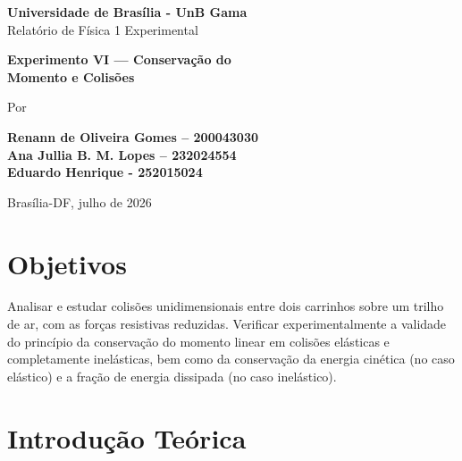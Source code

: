 \documentclass[12pt,a4paper]{article}
\begin{document}
\begin{titlepage}

\begin{center}

\large{\textbf{Universidade de Brasília - UnB Gama}}\\[1cm]



{\large Relatório de Física 1 Experimental}

\vspace{2.3cm}
{\large }
\vspace{2.6cm}



{\LARGE \bf  Experimento VI --- Conservação do\\ Momento e Colisões} \vspace{2cm}

Por
%
\vspace{2cm}

{\bf	Renann de Oliveira Gomes – 200043030 \\
		Ana Jullia B. M. Lopes – 232024554 \\
		Eduardo Henrique - 252015024 \\}



%
\vspace*{\fill}

%
{Brasília-DF, julho de 2026}


\end{center}
\end{titlepage}




\newpage


\section{Objetivos}
Analisar e estudar colisões unidimensionais entre dois carrinhos sobre um trilho de ar, com as
forças resistivas reduzidas. Verificar experimentalmente a validade do princípio da conservação
do momento linear em colisões elásticas e completamente inelásticas, bem como da conservação da
energia cinética (no caso elástico) e a fração de energia dissipada (no caso inelástico).



\section{Introdução Teórica}
\end{document}
